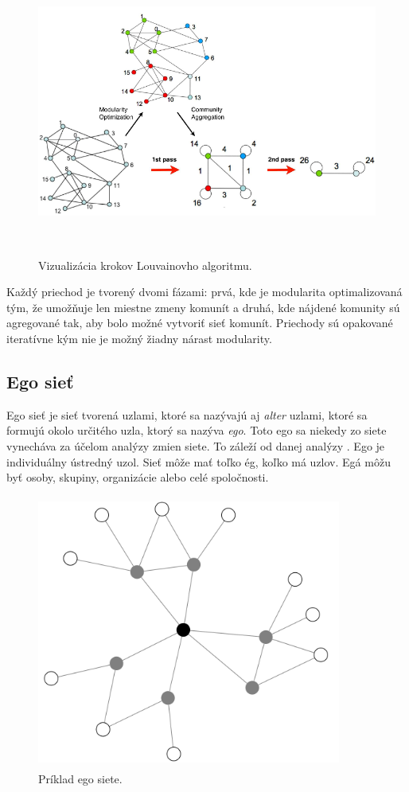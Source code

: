 \documentclass[slovak,master,public,dept460,male,cpdeclaration,oneside]{diploma}
\begin{document}
\begin{figure}[H]
\centering
\includegraphics[width=14.5cm, height=9.5cm]{figures/louvain}
\caption{Vizualizácia krokov Louvainovho algoritmu. }
\end{figure}

Každý priechod je tvorený dvomi fázami: prvá, kde je modularita optimalizovaná tým, že umožňuje len miestne zmeny komunít a druhá, kde nájdené komunity sú agregované tak, aby bolo možné vytvoriť sieť komunít. Priechody sú opakované iteratívne kým nie je možný žiadny nárast modularity.

\subsection{Ego sieť}

Ego sieť je sieť tvorená uzlami, ktoré sa nazývajú aj \textit{alter} uzlami, ktoré sa formujú okolo určitého uzla, ktorý sa nazýva \textit{ego}. Toto ego sa niekedy zo siete vynecháva za účelom analýzy zmien siete. To záleží od danej analýzy \cite{6}. Ego je individuálny ústredný uzol. Sieť môže mať toľko ég, koľko má uzlov. Egá môžu byť osoby, skupiny, organizácie alebo celé spoločnosti.


\begin{figure}[H]
\centering
\includegraphics[width=10cm, height=9cm]{figures/egonet}
\caption{Príklad ego siete.}
\end{figure}
\end{document}
